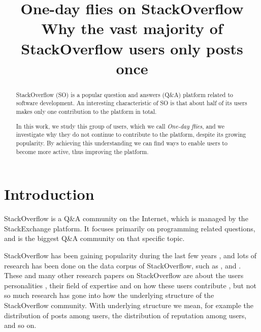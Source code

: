 \documentclass[conference]{IEEEtran}
\newcommand\odf{\emph{One-day flies}\xspace}
\begin{document}
\title{One-day flies on StackOverflow\\
{\LARGE Why the vast majority of StackOverflow users only posts once}}



\author{
}





\maketitle


\begin{abstract}


StackOverflow (SO) is a popular question and answers (Q\&A) platform related to
software development. An interesting characteristic of SO is that about 
half of its users makes only one contribution to the platform in total.

In this work, we study this group of users, which we call \odf, and we 
investigate why they do not continue to contribute to the platform, despite its
growing popularity. By achieving this understanding we can find ways to enable
users to become more active, thus improving the platform. 
\end{abstract}

\IEEEpeerreviewmaketitle



\section{Introduction}

StackOverflow is a Q\&A community on the Internet, which is managed by the
StackExchange platform. It focuses primarily on programming related questions,
and is the biggest Q\&A community on that specific topic.

StackOverflow has been gaining popularity during the last few years
\cite{anderson2012discovering}, and lots of research has been done on the data
corpus of StackOverflow, such as \cite{treude2011programmers},
\cite{barua2014developers} and \cite{morrison2013age}. These and many other
research papers on StackOverflow are about the users personalities
\cite{bosu2013building}, their field of expertise and on how these users
contribute \cite{movshovitz2013analysis}, but not so much research has gone
into how the underlying structure of the StackOverflow community. With
underlying structure we mean, for example the distribution of posts among
users, the distribution of reputation among users, and so on.
\end{document}
